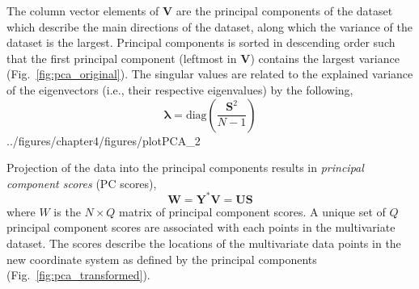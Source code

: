The column vector elements of $\mathbf{V}$ are the principal components of the dataset which describe the main directions of the dataset, along which the variance of the dataset is the largest.
Principal components is sorted in descending order such that the first principal component (leftmost in $\mathbf{V}$) contains the largest variance (Fig.~\ref{fig:pca_original}).
The singular values are related to the explained variance of the eigenvectors (i.e., their respective eigenvalues) by the following,
\begin{equation}
	\boldsymbol{\lambda} = \text{diag}\left(\frac{\mathbf{S}^2}{N-1}\right)
\label{eq:singular_values_variance}
\end{equation}
{../figures/chapter4/figures/plotPCA_2}

Projection of the data into the principal components results in \emph{principal component scores} (PC scores),
\begin{equation}
	\mathbf{W} = \mathbf{Y}^* \mathbf{V} = \mathbf{U} \mathbf{S}
\label{eq:pc_scores}
\end{equation}
where $W$ is the $N \times Q$ matrix of principal component scores.
A unique set of $Q$ principal component scores are associated with each points in the multivariate dataset.
The scores describe the locations of the multivariate data points in the new coordinate system as defined by the principal components (Fig.~\ref{fig:pca_transformed}).

